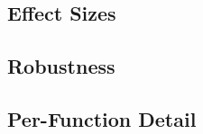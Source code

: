 \subsection{Effect Sizes}\label{sec:supp:cec2020:effects}


\begin{table}[htbp]
  \centering
  \caption{%
  }\label{tab:supp:cec2020:effects}
\end{table}

\subsection{Robustness}\label{sec:supp:cec2020:robustness}

%

\begin{table}[htbp]
  \centering
  \caption{%
  }\label{tab:supp:cec2020:robustness}
\end{table}

\subsection{Per-Function Detail}\label{sec:supp:cec2020:detail}

